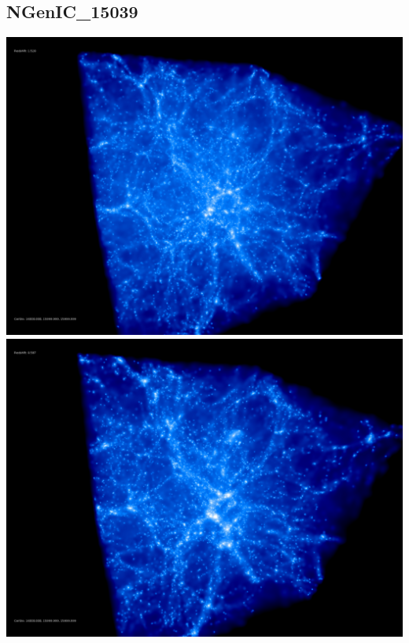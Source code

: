 % 
%
%
%
%
%
%
%


\newpage
\subsection{NGenIC\_15039}

\includegraphics[scale=0.1]{NGenIC_15039/50.jpg} 
\includegraphics[scale=0.1]{NGenIC_15039/100.jpg}  \\

